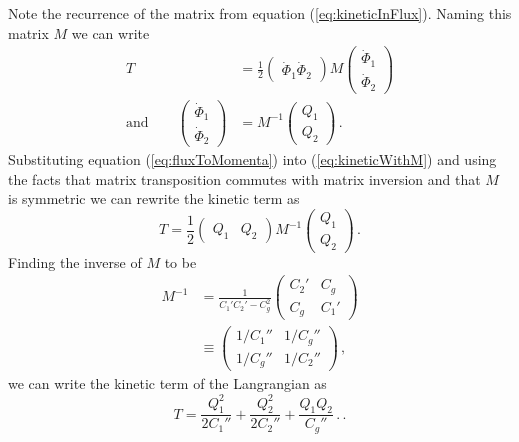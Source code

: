 Note the recurrence of the matrix from equation (\ref{eq:kineticInFlux}).
Naming this matrix $M$ we can write
\begin{align}
  T &=
    \frac{1}{2}
    \left( \begin{array}{cc} \dot{\Phi}_1 \dot{\Phi}_2 \end{array} \right)
    M
    \left( \begin{array}{c} \dot{\Phi}_1 \\ \dot{\Phi}_2 \end{array} \right)
    \label{eq:kineticWithM} \\
  \text{and} \qquad
  \left( \begin{array}{c} \dot{\Phi}_1 \\ \dot{\Phi}_2 \end{array} \right)
  &= M^{-1}
  \left( \begin{array}{c} Q_1 \\ Q_2 \end{array} \right) \, .
  \label{eq:fluxToMomenta}
\end{align}
Substituting equation (\ref{eq:fluxToMomenta}) into (\ref{eq:kineticWithM}) and using the facts that matrix transposition commutes with matrix inversion and that $M$ is symmetric we can rewrite the kinetic term as
\begin{equation}
  T =
  \frac{1}{2} \left( \begin{array}{cc} Q_1 & Q_2 \end{array} \right)
  M^{-1}
  \left( \begin{array}{c} Q_1 \\ Q_2 \end{array} \right) \, .
\end{equation}
Finding the inverse of $M$ to be
\begin{align}
  M^{-1}
  &= \frac{1}{C_1' C_2' - C_g^2}
    \left( \begin{array}{cc} C_2' & C_g \\ C_g & C_1' \end{array} \right) \nonumber \\
  &\equiv \left(
    \begin{array}{cc} 1/C_1'' & 1/C_g'' \\ 1/C_g'' & 1/C_2'' \end{array}
    \right) \, ,
\end{align}
we can write the kinetic term of the Langrangian as
\begin{equation}
  T =
      \frac{Q_1^2}{2 C_1''}
    + \frac{Q_2^2}{2 C_2''}
    + \frac{Q_1 Q_2}{C_g''} \, . \label{eq:kineticInP} \, .
\end{equation}

